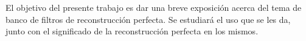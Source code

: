 El objetivo del presente trabajo es dar una breve exposición acerca del tema de banco de filtros de reconstrucción perfecta. Se estudiará el uso que se les da, junto con el significado de la reconstrucción perfecta en los mismos.
